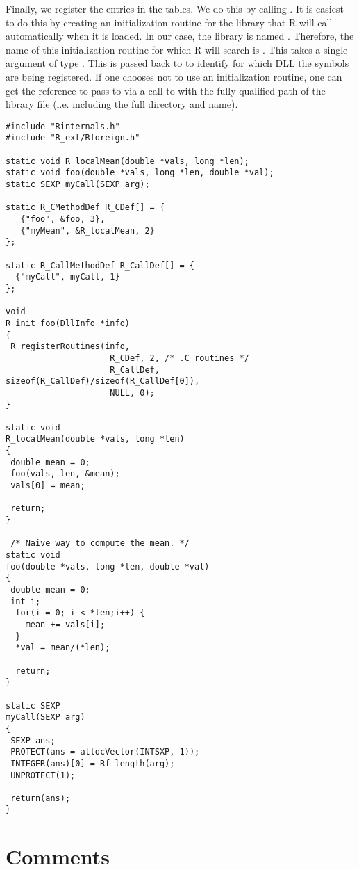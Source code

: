 \documentclass{article}
\begin{document}
Finally, we register the entries in the tables.  We do this by calling
.  It is easiest to do this by creating
an initialization routine for the library that R will call
automatically when it is loaded.  In our case, the library is named
. Therefore, the name of this initialization routine for
which R will search is .  This takes a single
argument of type .  This is passed back to
 to identify for which DLL the symbols
are being registered.  If one chooses not to use an initialization
routine, one can get the  reference to pass to
 via a call to 
with the fully qualified path of the library file (i.e. including the
full directory and name).


\begin{verbatim}
#include "Rinternals.h"
#include "R_ext/Rforeign.h"

static void R_localMean(double *vals, long *len);
static void foo(double *vals, long *len, double *val);
static SEXP myCall(SEXP arg);

static R_CMethodDef R_CDef[] = {
   {"foo", &foo, 3},
   {"myMean", &R_localMean, 2}
};

static R_CallMethodDef R_CallDef[] = {
  {"myCall", myCall, 1}
};

void
R_init_foo(DllInfo *info)
{
 R_registerRoutines(info, 
                     R_CDef, 2, /* .C routines */
                     R_CallDef, sizeof(R_CallDef)/sizeof(R_CallDef[0]), 
                     NULL, 0);
}

static void
R_localMean(double *vals, long *len)
{
 double mean = 0;
 foo(vals, len, &mean);
 vals[0] = mean;

 return;
}

 /* Naive way to compute the mean. */
static void
foo(double *vals, long *len, double *val)
{
 double mean = 0;
 int i;
  for(i = 0; i < *len;i++) {
    mean += vals[i];
  }
  *val = mean/(*len);

  return;
}

static SEXP
myCall(SEXP arg)
{
 SEXP ans;
 PROTECT(ans = allocVector(INTSXP, 1));
 INTEGER(ans)[0] = Rf_length(arg);
 UNPROTECT(1);

 return(ans);
}
\end{verbatim}


\section{Comments}
\end{document}
